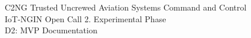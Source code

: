 \documentclass[a4paper]{article}
\begin{document}
 
\thispagestyle{empty}
\vfill
\begin{center}
    {\LARGE C2NG Trusted Uncrewed Aviation Systems Command and Control} \\
    \vspace{1cm}
    {\Large IoT-NGIN Open Call 2. Experimental Phase} \\
    \vspace{1cm}
    {\Large D2: MVP Documentation}
\end{center}
\vfill
\end{document}
